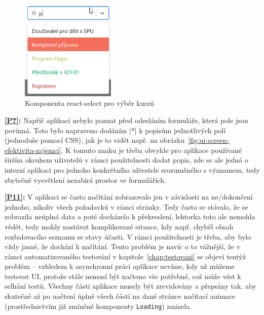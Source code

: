 \begin{figure}[h]\centering
    \includegraphics[width=0.4\textwidth]{img/ui-screen-select.png}
    \caption{Komponenta react-select pro výběr kurzů}\label{fig:ui-screen-select}
\end{figure}

\textbf{\ref{P7}:} Napříč aplikací nebylo poznat před odesláním formuláře, která pole jsou povinná. Toto bylo napraveno dodáním \cverb|*| k popisům jednotlivých polí (jednoduše pomocí CSS), jak je to vidět např. na obrázku~\ref{fig:ui-screen-efektivita-zajemci}. K tomuto znaku je třeba obvykle pro aplikace používané širším okruhem uživatelů v rámci použitelnosti dodat popis, zde se ale jedná o interní aplikaci pro jednoho konkrétního uživatele srozuměného s významem, tedy zbytečně vysvětlení nezabírá prostor ve formulářích.

\textbf{\ref{P11}:} V aplikaci se často načítání zobrazovalo jen v závislosti na ne/dokončení jednoho, nikoliv všech požadavků v rámci stránky. Tedy často se stávalo, že se zobrazila neúplná data a poté docházelo k překreslení, lektorka toto ale nemohla vědět, tedy mohly nastávat komplikované situace, kdy např. chyběl obsah rozbalovacího seznamu se stavy účasti. V rámci použitelnosti je třeba, aby bylo vždy jasné, že dochází k načítání. Tento problém je navíc o to vážnější, že v rámci automatizovaného testování v kapitole~\ref{chap:testovani} se objeví tentýž problém -- vzhledem k asynchronní práci aplikace nevíme, kdy už můžeme testovat UI, protože stále nemusí být načteno vše potřebné, což může vést k selhání testů. Všechny části aplikace musely být zrevidovány a přepsány tak, aby skutečně až po načtení úplně všech částí na dané stránce načítací animace (prostřednictvím již zmíněné komponenty \verb|Loading|) zmizela.

